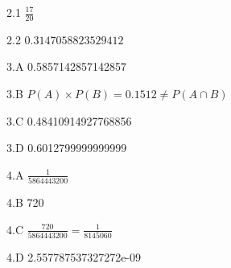\documentclass{article}
\begin{document}
\begin{comment}
	
A:get a sum of 11 or 12

$P(A)= \frac{3}{36}=\frac{1}{12}$

$P(fail)=(1-\frac{1}{12})^{15}$

$P(win)=1-P(fail)=1-(1-\frac{1}{12})^{15}$

\hspace*{\fill}

$P=8\times C_8^2\times \frac{7!}{7^7}$ 

\hspace*{\fill}

$n(7\enspace success\enspace3\enspace fail)=C_{10}^{3}=\frac{10\times9\times8}{3\times2\times1}=120$

\hspace*{\fill}
\end{comment}

2.1
$\frac{17}{20}$

\hspace*{\fill}

2.2
$0.3147058823529412$

\hspace*{\fill}

3.A
0.5857142857142857

\hspace*{\fill}

3.B
$P(A)\times P(B)=0.1512\neq P(A\cap B)$

\hspace*{\fill}

3.C
0.48410914927768856

\hspace*{\fill}

3.D
0.6012799999999999

\hspace*{\fill}

4.A
$\frac{1}{5864443200}$

\hspace*{\fill}

4.B
720

\hspace*{\fill}

4.C
$\frac{720}{5864443200}=\frac{1}{8145060}$

\hspace*{\fill}

4.D
2.557787537327272e-09

\hspace*{\fill}
\end{document}
